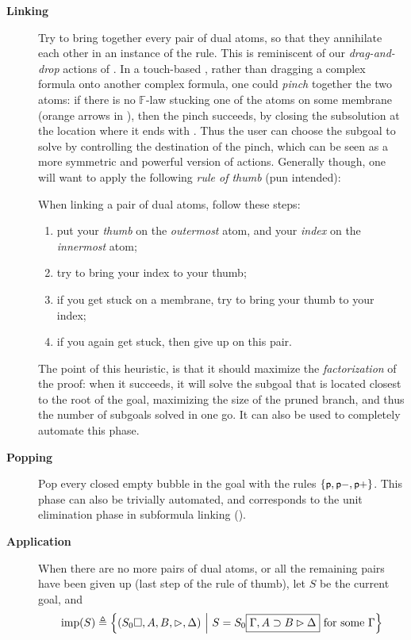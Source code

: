 \begin{description}
  \item[\textbf{Linking}] Try to bring together every pair of dual atoms, so
    that they annihilate each other in an instance of the 
    rule. This is reminiscent of our \emph{drag-and-drop} actions of
    . In a touch-based , rather than dragging a complex formula
    onto another complex formula, one could \emph{pinch} together the two atoms:
    if there is no $\mathbb{F}$-law stucking one of the atoms on some membrane
    (orange arrows in ), then the pinch succeeds, by
    closing the subsolution at the location where it ends with
    . Thus the user can choose the subgoal to solve by
    controlling the destination of the pinch, which can be seen as a more
    symmetric and powerful version of  actions. Generally though, one will
    want to apply the following \emph{rule of thumb} (pun intended):
    \begin{fact}
      When linking a pair of dual atoms, follow these steps:
      \begin{enumerate}
        \item put your \emph{thumb} on the \emph{outermost} atom, and your
              \emph{index} on the \emph{innermost} atom;
        \item try to bring your index to your thumb;
        \item if you get stuck on a membrane, try to bring your thumb to your
              index;
        \item if you again get stuck, then give up on this pair.
      \end{enumerate}
    \end{fact}
    The point of this heuristic, is that it should maximize the
    \emph{factorization} of the proof: when it succeeds, it will solve the
    subgoal that is located closest to the root of the goal, maximizing the size
    of the pruned branch, and thus the number of subgoals solved in one go. It
    can also be used to completely automate this phase.

  \item[\textbf{Popping}] Pop every closed empty bubble in the goal with the
  rules $\{\text{\small$\mathsf{p}$},\text{\small$\mathsf{p{-}}$},\text{\small$\mathsf{p{+}}$}\}$. This phase can also be trivially
  automated, and corresponds to the unit elimination phase in subformula linking
  ().

  \item[\textbf{Application}] When there are no more pairs of dual atoms, or all
    the remaining pairs have been given up (last step of the rule of thumb), let
    $S$ be the current goal, and
    $$\mathrm{imp}(S) \triangleq \left\{(S_0\square, A, B, \mathbin{\rhd}, \Delta) ~\middle|~ S = S_0\fbox{$\Gamma,
          A \supset B \mathbin{\rhd} \Delta$} \text{ for some $\Gamma$}\right\}$$


\end{description}
